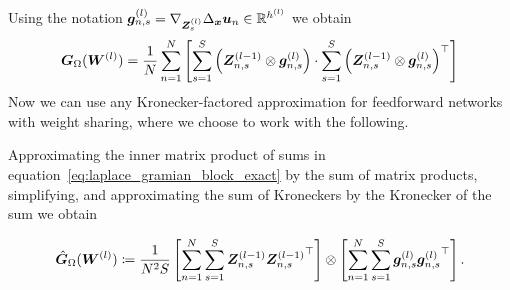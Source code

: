 Using the notation
${\bm{g}}_{n, s}^{(l)} = \nabla_{{\bm{Z}}_{s}^{(l)}} \Delta_{\bm{x}}{\bm{u}}_n\in\mathbb R^{h^{(l)}}$ we obtain
\begin{equation}\label{eq:laplace_gramian_block_exact}
    {\bm{G}}_\Omega({\bm{W}}^{(l)})
    =
    \frac1N\sum_{n=1}^N
    \left[\sum_{s=1}^S \left( {\bm{Z}}^{(l-1)}_{n,s}\otimes {\bm{g}}_{n,s}^{(l)} \right)
    \cdot
    \sum_{s=1}^S \left( {\bm{Z}}
    ^{(l-1)}_{n,s}\otimes {\bm{g}}_{n,s}^{(l)} \right)^\top\right]
\end{equation}
Now we can use any Kronecker-factored approximation for feedforward networks with weight sharing, where we choose to work with the following.

%


Approximating the inner matrix product of sums in equation~\eqref{eq:laplace_gramian_block_exact} by the sum of matrix products, simplifying, and approximating the sum of Kroneckers by the Kronecker of the sum we obtain
\begin{tcolorbox}[colframe=kfac, title={KFAC for ENGD with the Laplace operator},bottom=0mm,top=0mm,middle=0mm]
\begin{align}\label{eq:KFAC-PINN}
    \hat{\mG}_\Omega%
    (\mW^{(l)})
    \coloneqq \frac{1}{N^2 S}
    \left[\sum_{n=1}^N \sum_{s=1}^S \mZ^{(l-1)}_{n,s}{\mZ^{(l-1)}_{n,s}}^\top \right]
    \otimes
    \left[\sum_{n=1}^N\sum_{s=1}^S \vg^{(l)}_{n,s}{\vg^{(l)}_{n,s}}^\top   \right].
\end{align}
\end{tcolorbox}






